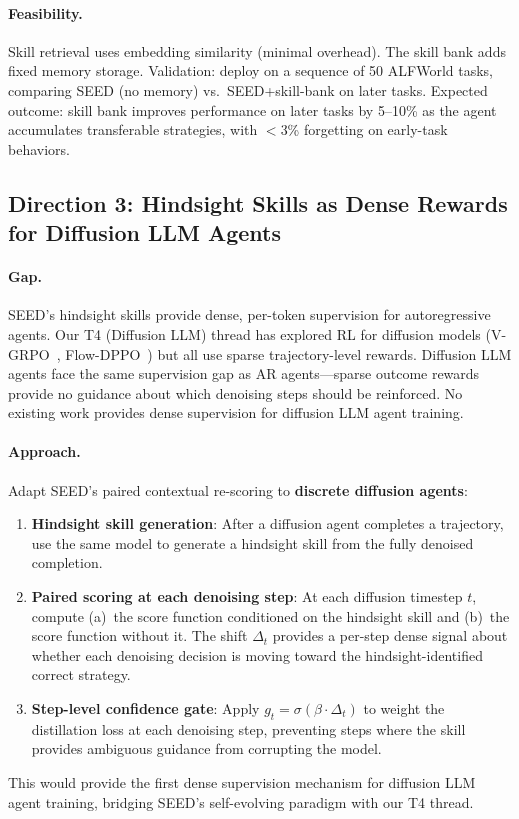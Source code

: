 \documentclass[11pt,a4paper]{article}
\begin{document}
\paragraph{Feasibility.} Skill retrieval uses embedding similarity (minimal overhead). The skill bank adds fixed memory storage. Validation: deploy on a sequence of 50 ALFWorld tasks, comparing SEED (no memory) vs.\ SEED+skill-bank on later tasks. Expected outcome: skill bank improves performance on later tasks by 5--10\% as the agent accumulates transferable strategies, with $<$3\% forgetting on early-task behaviors.

\subsection{Direction 3: Hindsight Skills as Dense Rewards for Diffusion LLM Agents}

\paragraph{Gap.} SEED's hindsight skills provide dense, per-token supervision for autoregressive agents. Our T4 (Diffusion LLM) thread has explored RL for diffusion models (V-GRPO~\cite{vgrpo2026}, Flow-DPPO~\cite{flowdppo2026}) but all use sparse trajectory-level rewards. Diffusion LLM agents face the same supervision gap as AR agents---sparse outcome rewards provide no guidance about which denoising steps should be reinforced. No existing work provides dense supervision for diffusion LLM agent training.

\paragraph{Approach.} Adapt SEED's paired contextual re-scoring to \textbf{discrete diffusion agents}:
\begin{enumerate}
\item \textbf{Hindsight skill generation}: After a diffusion agent completes a trajectory, use the same model to generate a hindsight skill from the fully denoised completion.
\item \textbf{Paired scoring at each denoising step}: At each diffusion timestep $t$, compute (a)~the score function conditioned on the hindsight skill and (b)~the score function without it. The shift $\Delta_t$ provides a per-step dense signal about whether each denoising decision is moving toward the hindsight-identified correct strategy.
\item \textbf{Step-level confidence gate}: Apply $g_t = \sigma(\beta \cdot \Delta_t)$ to weight the distillation loss at each denoising step, preventing steps where the skill provides ambiguous guidance from corrupting the model.
\end{enumerate}
This would provide the first dense supervision mechanism for diffusion LLM agent training, bridging SEED's self-evolving paradigm with our T4 thread.
\end{document}
